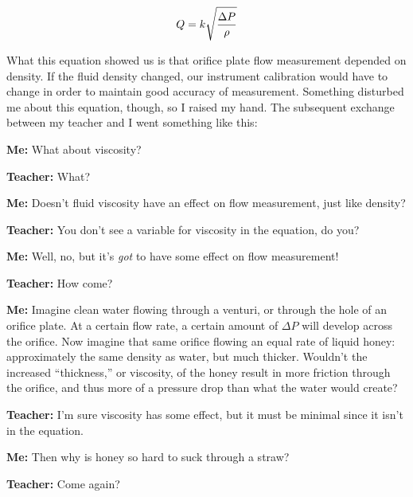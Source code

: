 $$Q = k \sqrt{{\Delta P} \over \rho}$$

What this equation showed us is that orifice plate flow measurement depended on density.  If the fluid density changed, our instrument calibration would have to change in order to maintain good accuracy of measurement.  Something disturbed me about this equation, though, so I raised my hand.  The subsequent exchange between my teacher and I went something like this:

\vskip 10pt
{\narrower \noindent
\textbf{Me:} What about viscosity?
\par}

\vskip 10pt
{\narrower \noindent
\textbf{Teacher:} What?
\par}

\vskip 10pt
{\narrower \noindent
\textbf{Me:} Doesn't fluid viscosity have an effect on flow measurement, just like density?
\par}

\vskip 10pt
{\narrower \noindent
\textbf{Teacher:} You don't see a variable for viscosity in the equation, do you?
\par}

\vskip 10pt
{\narrower \noindent
\textbf{Me:} Well, no, but it's \textit{got} to have some effect on flow measurement!
\par}

\vskip 10pt
{\narrower \noindent
\textbf{Teacher:} How come?
\par}

\vskip 10pt
{\narrower \noindent
\textbf{Me:} Imagine clean water flowing through a venturi, or through the hole of an orifice plate.  At a certain flow rate, a certain amount of $\Delta P$ will develop across the orifice.  Now imagine that same orifice flowing an equal rate of liquid honey: approximately the same density as water, but much thicker.  Wouldn't the increased ``thickness,'' or viscosity, of the honey result in more friction through the orifice, and thus more of a pressure drop than what the water would create?
\par}

\vskip 10pt
{\narrower \noindent
\textbf{Teacher:} I'm sure viscosity has some effect, but it must be minimal since it isn't in the equation. 
\par}

\vskip 10pt
{\narrower \noindent
\textbf{Me:} Then why is honey so hard to suck through a straw?
\par}

\vskip 10pt
{\narrower \noindent
\textbf{Teacher:} Come again?
\par}


